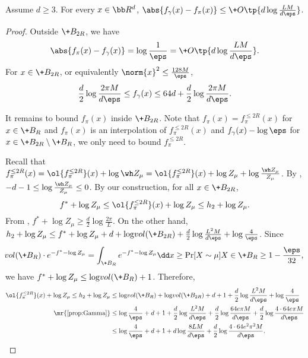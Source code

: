\begin{lemma}\label{lem:fclose}
    Assume $d\geq 3$. For every $x\in \bb R^d$, $\abs{f_\gamma(x)-f_\pi(x)} \le \+O\tp{d\log\frac{LM}{d\eps}}$.
\end{lemma}
\begin{proof}
    Outside $\+B_{2R}$, we have
    \[
        \abs{f_\pi(x) - f_\gamma(x)} = \log\frac{1}{\eps} = \+O\tp{d\log\frac{LM}{d\eps}}.
    \]
    For $x\in \+B_{2R}$, or equivalently $\norm{x}^2\le \frac{128M}{\eps}$, 
    \[
        \frac{d}{2}\log\frac{2\pi M}{d\eps} \leq f_\gamma(x) \leq 64d + \frac{d}{2}\log\frac{2\pi M}{d\eps}.
    \]
    
    It remains to bound $f_\pi(x)$ inside $\+B_{2R}$. Note that $f_\pi(x) = f^{\le 2R}_\pi(x)$ for $x\in \+B_R$ and $f_\pi(x)$ is an interpolation of $f^{\le 2R}_\pi(x)$ and $f_\gamma(x)-\log\eps$ for $x\in \+B_{2R}\setminus \+B_R$, we only need to bound $f^{\le 2R}_{\pi}$.

    Recall that ${f^{\le 2R}_{\pi}(x)} = {\ol{f^{\le 2R}_{\pi}}(x)+\log \wh Z_\mu}= {\ol{f^{\le 2R}_{\pi}}(x)+\log Z_\mu}+{\log\frac{\wh Z_\mu}{Z_\mu}}$. By , $-d -1 \leq \log\frac{\wh Z_\mu}{Z_\mu} \leq 0$.
    By our construction, for all $x\in \+B_{2R}$, 
    \[
        f^*+\log Z_{\mu} \leq \ol{f^{\le 2R}_{\pi}}(x)+\log Z_{\mu} \leq h_2 + \log Z_{\mu}.
    \]
    From , $f^*+\log Z_{\mu} \geq \frac{d}{2}\log\frac{2\pi}{L}$. On the other hand, $h_2 + \log Z_{\mu} \leq f^*+\log Z_{\mu} + d + \log \!{vol}(\+B_{2R}) + \frac{d}{2}\log\frac{L^2M}{d\eps} + \log \frac{4}{\eps}$. Since
    \[
        \!{vol}(\+B_R)\cdot e^{-f^* - \log Z_{\mu}} = \int_{\+B_R} e^{-f^* - \log Z_{\mu}} \dd x \geq \Pr[X\sim \mu]{X\in \+B_R} \geq 1-\frac{\eps}{32}, 
    \]
    we have $f^*+\log Z_{\mu} \leq \log \!{vol}(\+B_R) + 1$. Therefore, 
    \begin{align*}
        \ol{f^{\le 2R}_{\pi}}(x)+\log Z_{\mu} \leq h_2 + \log Z_{\mu} &\leq \log \!{vol}(\+B_R) + \log \!{vol}(\+B_{2R}) + d+1 + \frac{d}{2}\log\frac{L^2M}{d\eps} + \log \frac{4}{\eps} \\
        \mr{\Cref{prop:Gamma}}
        &\leq \log \frac{4}{\eps} + d+1 + \frac{d}{2}\log \frac{ L^2 M}{d\eps} + \frac{d}{2}\log \frac{64e\pi M}{d\eps} + \frac{d}{2}\log \frac{4\cdot 64e\pi M}{d\eps} \\
        & \leq \log \frac{4}{\eps} + d+ 1 + d\log \frac{8 L M}{d\eps} + \frac{d}{2}\log \frac{4\cdot 64 e^2\pi^2 M}{d\eps}.
    \end{align*}


\end{proof}
